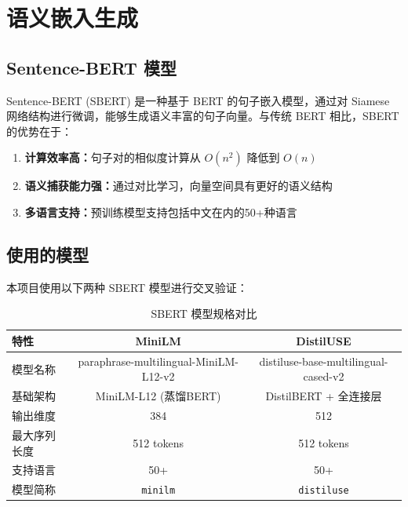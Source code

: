 \documentclass[12pt,a4paper]{article}
\theoremstyle{definition}
\begin{document}
\section{语义嵌入生成}

\subsection{Sentence-BERT 模型}

Sentence-BERT (SBERT) \cite{reimers2019sentence} 是一种基于 BERT 的句子嵌入模型，通过对 Siamese 网络结构进行微调，能够生成语义丰富的句子向量。与传统 BERT 相比，SBERT 的优势在于：

\begin{enumerate}
    \item \textbf{计算效率高：}句子对的相似度计算从 $O(n^2)$ 降低到 $O(n)$
    \item \textbf{语义捕获能力强：}通过对比学习，向量空间具有更好的语义结构
    \item \textbf{多语言支持：}预训练模型支持包括中文在内的50+种语言
\end{enumerate}

\subsection{使用的模型}

本项目使用以下两种 SBERT 模型进行交叉验证：

\begin{table}[H]
    \centering
    \caption{SBERT 模型规格对比}
    \label{tab:models}
    \begin{tabular}{@{}lcc@{}}
        \toprule
        \textbf{特性} & \textbf{MiniLM} & \textbf{DistilUSE} \\
        \midrule
        模型名称 & paraphrase-multilingual-MiniLM-L12-v2 & distiluse-base-multilingual-cased-v2 \\
        基础架构 & MiniLM-L12 (蒸馏BERT) & DistilBERT + 全连接层 \\
        输出维度 & 384 & 512 \\
        最大序列长度 & 512 tokens & 512 tokens \\
        支持语言 & 50+ & 50+ \\
        模型简称 & \texttt{minilm} & \texttt{distiluse} \\
        \bottomrule
    \end{tabular}
\end{table}
\end{document}
